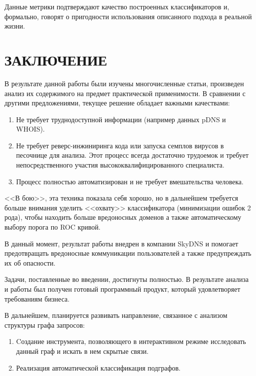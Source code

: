 \documentclass[a4paper,14pt]{extreport} %
\begin{document}
Данные метрики подтверждают качество построенных классификаторов и, формально, говорят о пригодности использования описанного подхода в реальной жизни.

\chapter*{ЗАКЛЮЧЕНИЕ}
В результате данной работы были изучены многочисленные статьи, произведен анализ их содержимого на предмет практической применимости. В сравнении с другими предложениями, текущее решение обладает важными качествами:
\begin{enumerate}
	\item Не требует труднодоступной информации (например данных pDNS и WHOIS).
	\item Не требует реверс-инжиниринга кода или запуска семплов вирусов в песочнице для анализа. Этот процесс всегда достаточно трудоемок и требует непосредственного участия высококвалифицированного специалиста.
	\item Процесс полностью автоматизирован и не требует вмешательства человека.
\end{enumerate}


<<В бою>>, эта техника показала себя хорошо, но в дальнейшем требуется больше внимания уделить <<охвату>> классификатора (минимизации ошибок 2 рода), чтобы находить больше вредоносных доменов а также автоматическому выбору порога по ROC кривой.

В данный момент, результат работы внедрен 	в компании SkyDNS и помогает предотвращать вредоносные коммуникации пользователей а также предупреждать их об опасности.

Задачи, поставленные во введении, достигнуты полностью. В результате анализа и работы был получен готовый программный продукт, который удовлетворяет требованиям бизнеса. 

В дальнейшем, планируется развивать направление, связанное с анализом структуры графа запросов:
\begin{enumerate}
	\item Cоздание инструмента, позволяющего в интерактивном режиме исследовать данный граф и искать в нем скрытые связи.
	\item Реализация автоматической классификация подграфов.
\end{enumerate}
\end{document}
